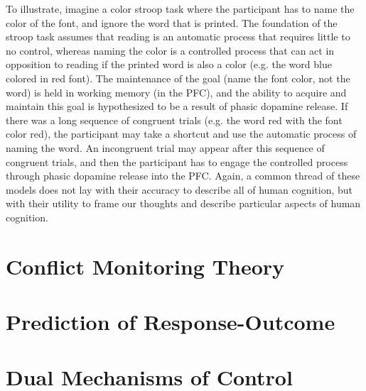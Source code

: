 \documentclass[phd,appendix,figures]{uithesis}
\begin{document}
To illustrate, imagine a color stroop task where the participant has to name the color of the font, and ignore the word that is printed.
The foundation of the stroop task assumes that reading is an automatic process that requires little to no control, whereas naming the color is a controlled process that can act in opposition to reading if the printed word is also a color (e.g. the word blue colored in red font).
The maintenance of the goal (name the font color, not the word) is held in working memory (in the PFC), and the ability to acquire and maintain this goal is hypothesized to be a result of phasic dopamine release. 
If there was a long sequence of congruent trials (e.g. the word red with the font color red), the participant may take a shortcut and use the automatic process of naming the word.
An incongruent trial may appear after this sequence of congruent trials, and then the participant has to engage the controlled process through phasic dopamine release into the PFC.
Again, a common thread of these models does not lay with their accuracy to describe all of human cognition, but with their utility to frame our thoughts and describe particular aspects of human cognition. 

\section{Conflict Monitoring Theory}

\section{Prediction of Response-Outcome}

\section{Dual Mechanisms of Control}
\end{document}
